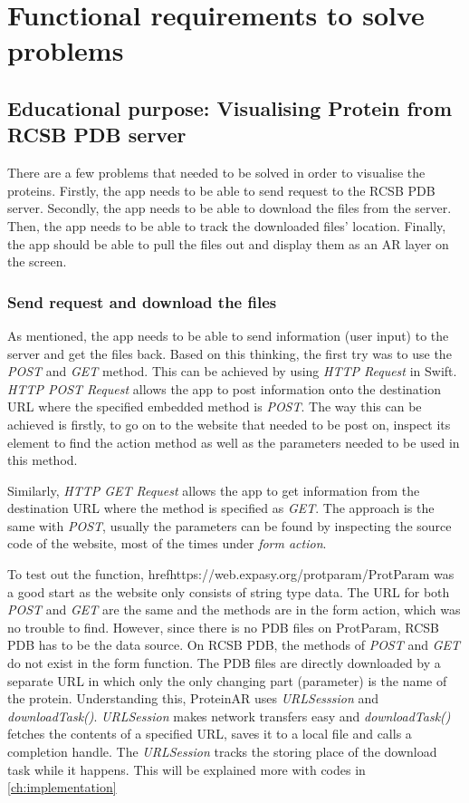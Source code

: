 \section{Functional requirements to solve problems}
\subsection{Educational purpose: Visualising Protein from RCSB PDB server}
There are a few problems that needed to be solved in order to visualise the proteins. 
Firstly, the app needs to be able to send request to the RCSB PDB server. Secondly, the app needs to be able to download the files from the server. Then, the app needs to be able to track the downloaded files’ location. Finally, the app should be able to pull the files out and display them as an AR layer on the screen. 
	\subsubsection{Send request and download the files}
As mentioned, the app needs to be able to send information (user input) to the server and get the files back. Based on this thinking, the first try was to use the \emph{POST} and \emph{GET} method. This can be achieved by using \emph{HTTP Request} in Swift. 
\emph{HTTP POST Request} allows the app to post information onto the destination URL where the specified embedded method is \emph{POST}. The way this can be achieved is firstly, to go on to the website that needed to be post on, inspect its element to find the action method as well as the parameters needed to be used in this method. 

Similarly, \emph{HTTP GET Request }allows the app to get information from the destination URL where the method is specified as \emph{GET}. The approach is the same with \emph{POST}, usually the parameters can be found by inspecting the source code of the website, most of the times under \emph{form action}.

To test out the function, href{https://web.expasy.org/protparam/}{ProtParam} was a good start as the website only consists of string type data. The URL for both \emph{POST} and \emph{GET} are the same and the methods are in the form action, which was no trouble to find. 
However, since there is no PDB files on ProtParam, RCSB PDB has to be the data source. On RCSB PDB, the methods of \emph{POST} and \emph{GET} do not exist in the form function. The PDB files are directly downloaded by a separate URL in which only the only changing part (parameter) is the name of the protein. Understanding this, ProteinAR uses \emph{URLSesssion} and \emph{downloadTask()}. \emph{URLSession} makes network transfers easy and \emph{downloadTask()} fetches the contents of a specified URL, saves it to a local file and calls a completion handle. The \emph{URLSession} tracks the storing place of the download task while it happens. This will be explained more with codes in \autoref{ch:implementation}
	
